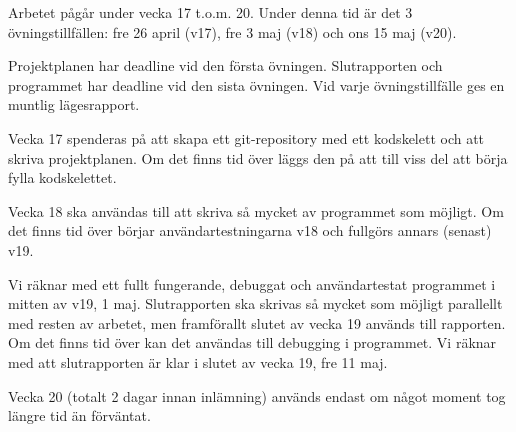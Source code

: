 Arbetet pågår under vecka 17 t.o.m. 20.
Under denna tid är det 3 övningstillfällen:
fre 26 april (v17),
fre 3 maj (v18) och
ons 15 maj (v20).

Projektplanen har deadline vid den första övningen.
Slutrapporten och programmet har deadline vid den sista övningen.
Vid varje övningstillfälle ges en muntlig lägesrapport.

Vecka 17 spenderas på att skapa ett git-repository med ett kodskelett och
att skriva projektplanen.
Om det finns tid över läggs den på att till viss del att börja
fylla kodskelettet.

Vecka 18 ska användas till att skriva så mycket av programmet som möjligt.
Om det finns tid över börjar användartestningarna v18 och fullgörs annars
(senast) v19.

Vi räknar med ett fullt fungerande, debuggat och användartestat
programmet i mitten av v19, 1 maj.
Slutrapporten ska skrivas så mycket som möjligt parallellt
med resten av arbetet,
men framförallt slutet av vecka 19 används till rapporten.
Om det finns tid över kan det användas till debugging i programmet.
Vi räknar med att slutrapporten är klar i slutet av vecka 19, fre 11 maj.

Vecka 20 (totalt 2 dagar innan inlämning) används endast om något
moment tog längre tid än förväntat.
